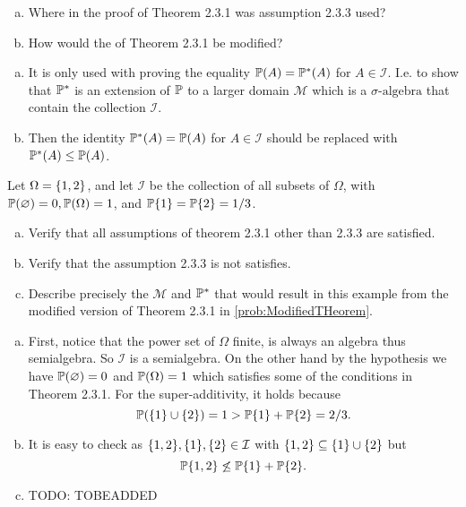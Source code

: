 \begin{problem}
	\label{prob:ModifiedTHeorem}
	\begin{enumerate}[(a)]
		\item Where in the proof of Theorem 2.3.1 was assumption 2.3.3 used?
		\item How would the  of Theorem 2.3.1 be modified?
	\end{enumerate}
\end{problem}
\begin{solution}
	\begin{enumerate}[(a)]
		\item It is only used with proving the equality $ \mathbb{P}(A) = \mathbb{P}^*(A) $ for $ A \in \mathcal{I} $. I.e. to show that $ \mathbb{P}^* $ is an extension of $ \mathbb{P} $ to a larger domain $ \mathcal{M} $ which is a $\sigma\text{-algebra}$ that contain the collection $ \mathcal{I} $.
		\item Then the identity $ \mathbb{P}^*(A) = \mathbb{P}(A) $ for $ A \in \mathcal{I} $ should be replaced with $ \mathbb{P}^*(A) \leq \mathbb{P}(A) $.
 	\end{enumerate}
\end{solution}

\begin{problem}
	Let $ \Omega=\{1,2\} $, and let $ \mathcal{I} $ be the collection of all subsets of $ \Omega $, with $ \mathbb{P}(\varnothing)=0, \mathbb{P}(\Omega) = 1 $, and $ \mathbb{P}\{1\}=\mathbb{P}\{2\} = 1/3 $.
	\begin{enumerate}[(a)]
		\item Verify that all assumptions of theorem 2.3.1 other than 2.3.3 are satisfied.
		\item Verify that the assumption 2.3.3 is not satisfies.
		\item Describe precisely the $ \mathcal{M} $ and $ \mathbb{P}^* $ that would result in this example from the modified version of Theorem 2.3.1 in \autoref{prob:ModifiedTHeorem}.
	\end{enumerate}
\end{problem}
\begin{solution}
	\begin{enumerate}[(a)]
		\item First, notice that the power set of $ \Omega $ finite, is always an algebra thus semialgebra. So $ \mathcal{I} $ is a semialgebra. On the other hand by the hypothesis we have $ \mathbb{P}(\varnothing) = 0 $ and $ \mathbb{P}(\Omega) = 1 $ which satisfies some of the conditions in Theorem 2.3.1. For the super-additivity, it holds because 
		\[ \mathbb{P}(\{1\}\cup\{2\}) = 1 > \mathbb{P}\{1\} + \mathbb{P}\{2\} = 2/3. \]
		\item It is easy to check as $ \{1,2\},\{1\},\{2\} \in \mathcal{I} $ with $ \{1,2\} \subseteq \{1\}\cup \{2\} $ but
		\[ \mathbb{P}\{1,2\} \not\leq \mathbb{P}\{1\}+\mathbb{P}\{2\}.\]
		\item {\color{red} \noindent TODO: TOBEADDED}
	\end{enumerate}
\end{solution}



